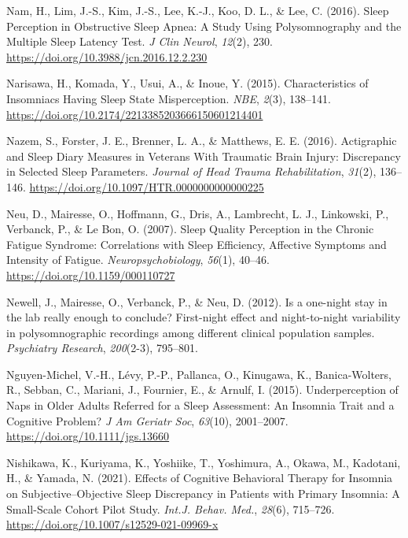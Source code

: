 \documentclass[
]{article}
\newlength{\cslhangindent}
\newenvironment{CSLReferences}[2] %
 {\begin{list}{}{%
  \setlength{\itemindent}{0pt}
  \setlength{\leftmargin}{0pt}
  \setlength{\parsep}{0pt}
  \ifodd #1
   \setlength{\leftmargin}{\cslhangindent}
   \setlength{\itemindent}{-1\cslhangindent}
  \fi
  \setlength{\itemsep}{#2\baselineskip}}}
 {\end{list}}
\begin{document}
\begin{CSLReferences}{1}{0}
Nam, H., Lim, J.-S., Kim, J.-S., Lee, K.-J., Koo, D. L., \& Lee, C. (2016). Sleep {Perception} in {Obstructive} {Sleep} {Apnea}: {A} {Study} {Using} {Polysomnography} and the {Multiple} {Sleep} {Latency} {Test}. \emph{J Clin Neurol}, \emph{12}(2), 230. \url{https://doi.org/10.3988/jcn.2016.12.2.230}

Narisawa, H., Komada, Y., Usui, A., \& Inoue, Y. (2015). Characteristics of {Insomniacs} {Having} {Sleep} {State} {Misperception}. \emph{NBE}, \emph{2}(3), 138--141. \url{https://doi.org/10.2174/2213385203666150601214401}

Nazem, S., Forster, J. E., Brenner, L. A., \& Matthews, E. E. (2016). Actigraphic and {Sleep} {Diary} {Measures} in {Veterans} {With} {Traumatic} {Brain} {Injury}: {Discrepancy} in {Selected} {Sleep} {Parameters}. \emph{Journal of Head Trauma Rehabilitation}, \emph{31}(2), 136--146. \url{https://doi.org/10.1097/HTR.0000000000000225}

Neu, D., Mairesse, O., Hoffmann, G., Dris, A., Lambrecht, L. J., Linkowski, P., Verbanck, P., \& Le Bon, O. (2007). Sleep {Quality} {Perception} in the {Chronic} {Fatigue} {Syndrome}: {Correlations} with {Sleep} {Efficiency}, {Affective} {Symptoms} and {Intensity} of {Fatigue}. \emph{Neuropsychobiology}, \emph{56}(1), 40--46. \url{https://doi.org/10.1159/000110727}

Newell, J., Mairesse, O., Verbanck, P., \& Neu, D. (2012). Is a one-night stay in the lab really enough to conclude? First-night effect and night-to-night variability in polysomnographic recordings among different clinical population samples. \emph{Psychiatry Research}, \emph{200}(2-3), 795--801.

Nguyen-Michel, V.-H., Lévy, P.-P., Pallanca, O., Kinugawa, K., Banica-Wolters, R., Sebban, C., Mariani, J., Fournier, E., \& Arnulf, I. (2015). Underperception of {Naps} in {Older} {Adults} {Referred} for a {Sleep} {Assessment}: {An} {Insomnia} {Trait} and a {Cognitive} {Problem}? \emph{J Am Geriatr Soc}, \emph{63}(10), 2001--2007. \url{https://doi.org/10.1111/jgs.13660}

Nishikawa, K., Kuriyama, K., Yoshiike, T., Yoshimura, A., Okawa, M., Kadotani, H., \& Yamada, N. (2021). Effects of {Cognitive} {Behavioral} {Therapy} for {Insomnia} on {Subjective}--{Objective} {Sleep} {Discrepancy} in {Patients} with {Primary} {Insomnia}: A {Small}-{Scale} {Cohort} {Pilot} {Study}. \emph{Int.J. Behav. Med.}, \emph{28}(6), 715--726. \url{https://doi.org/10.1007/s12529-021-09969-x}


\end{CSLReferences}
\end{document}
